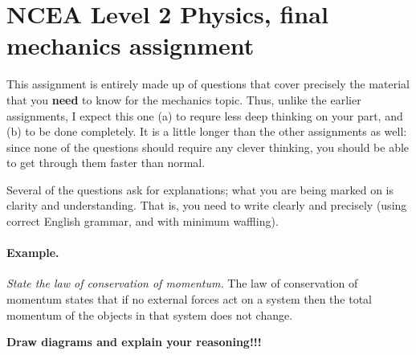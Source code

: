 \documentclass[answers]{exam}
\begin{document}
\section*{NCEA Level 2 Physics, final mechanics assignment}
This assignment is entirely made up of questions that cover precisely the material
that you \textbf{need} to know for the mechanics topic. Thus, unlike the earlier
assignments, I expect this one (a) to requre less deep thinking on your part, and
(b) to be done completely.
It is a little longer than the other assignments as well: since none of the questions
should require any clever thinking, you should be able to get through them faster
than normal.

Several of the questions ask for explanations; what you are being marked on is clarity
and understanding. That is, you need to write clearly and precisely (using correct English grammar, and
with minimum waffling).

\paragraph{Example.} \emph{State the law of conservation of momentum.} The law of conservation
of momentum states that if no external forces act on a system then the total momentum of
the objects in that system does not change.


\begin{center}
{\color{red}\large{\textbf{Draw diagrams and explain your reasoning!!!}}}\end{center}
\end{document}
